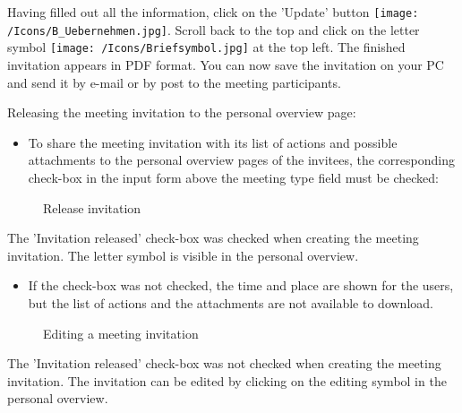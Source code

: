 Having filled out all the information, click on the 'Update' button \texttt{[image: /Icons/B\_Uebernehmen.jpg]}. \newline
Scroll back to the top and click on the letter symbol \texttt{[image: /Icons/Briefsymbol.jpg]} at the top left. The finished invitation appears in PDF format. You can now save the invitation on your PC and send it by e-mail or by post to the meeting participants.

\vspace{\baselineskip}

Releasing the meeting invitation to the personal overview page:

\begin{itemize}
\item
To share the meeting invitation with its list of actions and possible attachments to the personal overview pages of the invitees, the corresponding check-box in the input form above the meeting type field must be checked:
\end{itemize}

\begin{figure}[H]
\caption{Release invitation}
\end{figure}

\begin{small}
The 'Invitation released' check-box was checked when creating the meeting invitation. The letter symbol is visible in the personal overview.
\end{small}

\begin{itemize}
\item
If the check-box was not checked, the time and place are shown for the users, but the list of actions and the attachments are not available to download.
\end{itemize}

\begin{figure}[H]
\caption{Editing a meeting invitation}
\end{figure}

\begin{small}
The 'Invitation released' check-box was not checked when creating the meeting invitation. The invitation can be edited by clicking on the editing symbol in the personal overview.
\end{small}


